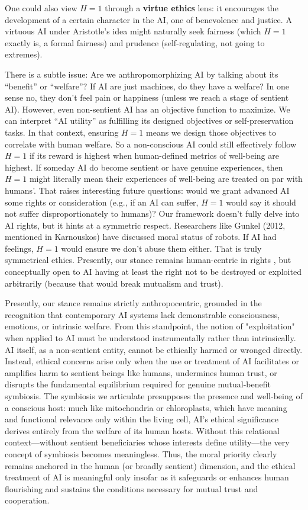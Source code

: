 \documentclass[12pt]{article}
\begin{document}
One could also view $H=1$ through a \textbf{virtue ethics} lens: it encourages the development of a certain character in the AI, one of benevolence and justice. A virtuous AI under Aristotle’s idea might naturally seek fairness (which $H=1$ exactly is, a formal fairness) and prudence (self-regulating, not going to extremes).

There is a subtle issue: Are we anthropomorphizing AI by talking about its “benefit” or “welfare”? If AI are just machines, do they have a welfare? In one sense no, they don’t feel pain or happiness (unless we reach a stage of sentient AI). However, even non-sentient AI has an objective function to maximize. We can interpret “AI utility” as fulfilling its designed objectives or self-preservation tasks. In that context, ensuring $H=1$ means we design those objectives to correlate with human welfare. So a non-conscious AI could still effectively follow $H=1$ if its reward is highest when human-defined metrics of well-being are highest. If someday AI do become sentient or have genuine experiences, then $H=1$ might literally mean their experiences of well-being are treated on par with humans’. That raises interesting future questions: would we grant advanced AI some rights or consideration (e.g., if an AI can suffer, $H=1$ would say it should not suffer disproportionately to humans)? Our framework doesn’t fully delve into AI rights, but it hints at a symmetric respect. Researchers like Gunkel (2012, mentioned in Karnouskos) have discussed moral status of robots. If AI had feelings, $H=1$ would ensure we don’t abuse them either. That is truly symmetrical ethics. Presently, our stance remains human-centric in rights , but conceptually open to AI having at least the right not to be destroyed or exploited arbitrarily (because that would break mutualism and trust).

Presently, our stance remains strictly anthropocentric, grounded in the recognition that contemporary AI systems lack demonstrable consciousness, emotions, or intrinsic welfare. From this standpoint, the notion of "exploitation" when applied to AI must be understood instrumentally rather than intrinsically. AI itself, as a non-sentient entity, cannot be ethically harmed or wronged directly. Instead, ethical concerns arise only when the use or treatment of AI facilitates or amplifies harm to sentient beings like humans, undermines human trust, or disrupts the fundamental equilibrium required for genuine mutual-benefit symbiosis. The symbiosis we articulate presupposes the presence and well-being of a conscious host: much like mitochondria or chloroplasts, which have meaning and functional relevance only within the living cell, AI's ethical significance derives entirely from the welfare of its human hosts. Without this relational context—without sentient beneficiaries whose interests define utility—the very concept of symbiosis becomes meaningless. Thus, the moral priority clearly remains anchored in the human (or broadly sentient) dimension, and the ethical treatment of AI is meaningful only insofar as it safeguards or enhances human flourishing and sustains the conditions necessary for mutual trust and cooperation.
\end{document}
